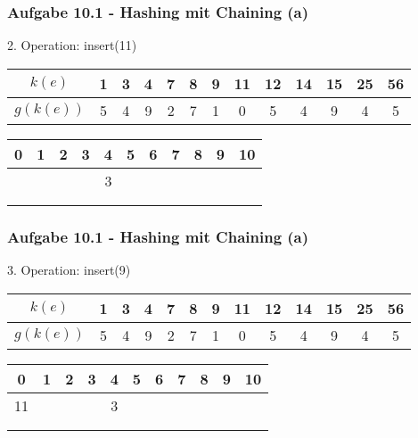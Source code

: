   \begin{frame}
    \frametitle{Aufgabe 10.1 - Hashing mit Chaining (a)}
    2. Operation: insert(11)
    \begin{center}
      \begin{tabular}{c|c|c|c|c|c|c|c|c|c|c|c|c}
        $k(e)$    & 1 & 3 & 4 & 7 & 8 & 9 & 11 & 12 & 14 & 15 & 25 & 56 \\
        \hline
        $g(k(e))$ & 5 & 4 & 9 & 2 & 7 & 1 & 0  & 5  & 4  & 9  & 4  & 5  \\
      \end{tabular}
  
      \bigskip
  
      \begin{tabular}{c|c|c|c|c|c|c|c|c|c|c}
        0 & 1 & 2 & 3 & 4 & 5 & 6 & 7 & 8 & 9 & 10 \\
        \hline
          &   &   &   & 3 &   &   &   &   &   &    \\
          &   &   &   &   &   &   &   &   &   &    \\
          &   &   &   &   &   &   &   &   &   &    \\
      \end{tabular}
    \end{center}
  \end{frame}
  
  \begin{frame}
    \frametitle{Aufgabe 10.1 - Hashing mit Chaining (a)}
    3. Operation: insert(9)
    \begin{center}
      \begin{tabular}{c|c|c|c|c|c|c|c|c|c|c|c|c}
        $k(e)$    & 1 & 3 & 4 & 7 & 8 & 9 & 11 & 12 & 14 & 15 & 25 & 56 \\
        \hline
        $g(k(e))$ & 5 & 4 & 9 & 2 & 7 & 1 & 0  & 5  & 4  & 9  & 4  & 5  \\
      \end{tabular}
  
      \bigskip
  
      \begin{tabular}{c|c|c|c|c|c|c|c|c|c|c}
        0  & 1 & 2 & 3 & 4 & 5 & 6 & 7 & 8 & 9 & 10 \\
        \hline
        11 &   &   &   & 3 &   &   &   &   &   &    \\
           &   &   &   &   &   &   &   &   &   &    \\
           &   &   &   &   &   &   &   &   &   &    \\
      \end{tabular}
    \end{center}
  \end{frame}
  
